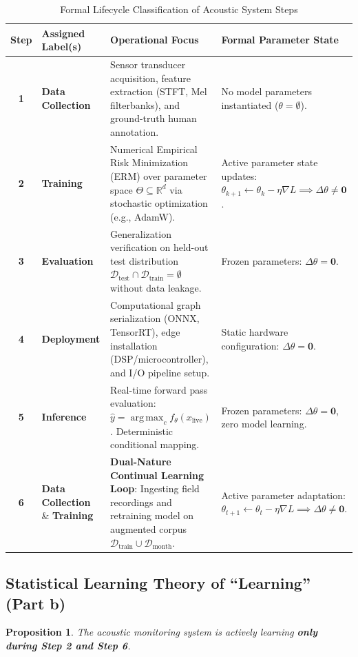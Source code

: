 \documentclass[11pt,a4paper]{article}
\theoremstyle{definition}
\theoremstyle{plain}
\newtheorem{proposition}[theorem]{Proposition}
\theoremstyle{remark}
\DeclareMathOperator*{\argmax}{arg\,max}
\newcommand{\R}{\mathbb{R}}
\begin{document}
\begin{table}[htbp]
\centering
\small
\caption{Formal Lifecycle Classification of Acoustic System Steps}
\label{tab:lifecycle_classification}
\begin{tabularx}{\textwidth}{c l X X}
\toprule
\textbf{Step} & \textbf{Assigned Label(s)} & \textbf{Operational Focus} & \textbf{Formal Parameter State} \\
\midrule
\textbf{1} & \textbf{Data Collection} & Sensor transducer acquisition, feature extraction (STFT, Mel filterbanks), and ground-truth human annotation. & No model parameters instantiated ($\theta = \emptyset$). \\
\addlinespace
\textbf{2} & \textbf{Training} & Numerical Empirical Risk Minimization (ERM) over parameter space $\Theta \subseteq \R^d$ via stochastic optimization (e.g., AdamW). & Active parameter state updates: $\theta_{k+1} \leftarrow \theta_k - \eta \nabla L \implies \Delta \theta \neq \mathbf{0}$. \\
\addlinespace
\textbf{3} & \textbf{Evaluation} & Generalization verification on held-out test distribution $\mathcal{D}_{\text{test}} \cap \mathcal{D}_{\text{train}} = \emptyset$ without data leakage. & Frozen parameters: $\Delta \theta = \mathbf{0}$. \\
\addlinespace
\textbf{4} & \textbf{Deployment} & Computational graph serialization (ONNX, TensorRT), edge installation (DSP/microcontroller), and I/O pipeline setup. & Static hardware configuration: $\Delta \theta = \mathbf{0}$. \\
\addlinespace
\textbf{5} & \textbf{Inference} & Real-time forward pass evaluation: $\hat{y} = \argmax_{c} f_\theta(x_{\text{live}})$. Deterministic conditional mapping. & Frozen parameters: $\Delta \theta = \mathbf{0}$, zero model learning. \\
\addlinespace
\textbf{6} & \textbf{Data Collection} \newline \& \textbf{Training} & \textbf{Dual-Nature Continual Learning Loop}: Ingesting field recordings and retraining model on augmented corpus $\mathcal{D}_{\text{train}} \cup \mathcal{D}_{\text{month}}$. & Active parameter adaptation: $\theta_{t+1} \leftarrow \theta_t - \eta \nabla L \implies \Delta \theta \neq \mathbf{0}$. \\
\bottomrule
\end{tabularx}
\end{table}

\subsection{Statistical Learning Theory of ``Learning'' (Part b)}
\begin{proposition}
The acoustic monitoring system is actively learning \textbf{only during Step 2 and Step 6}.
\end{proposition}
\end{document}
